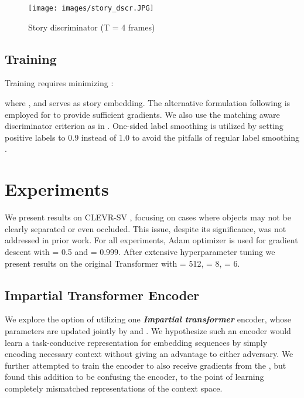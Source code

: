 \documentclass{article}
\begin{document}
\begin{figure}[t]
\centering
\texttt{[image: images/story\_dscr.JPG]}
\caption{Story discriminator  (T = 4 frames)}
\label{fig:st_dscr}
\end{figure}

\subsection{Training}
Training requires minimizing : \hfill
\vspace{-0.3cm}

where , and  serves as story embedding. The alternative formulation following \cite{goodfellow2014gans} is employed for  to provide sufficient gradients. We also
use the matching aware discriminator criterion as in \cite{ref2}. One-sided label smoothing is utilized by setting positive labels to 0.9 instead of 1.0 to avoid the pitfalls of regular label smoothing \cite{ref4}.



\section{Experiments}
\label{sec:experiments}
We present results on CLEVR-SV \cite{clevr}, focusing on cases where objects may not be clearly separated or even occluded. This issue, despite its significance, was not addressed in prior work. For all experiments, Adam optimizer \cite{adam} is used for gradient descent with  = 0.5 and  = 0.999. After extensive hyperparameter tuning we present results on the original Transformer with  = 512,  = 8,  = 6. 
\subsection{Impartial Transformer Encoder}
We explore the option of utilizing one \textbf{\textit{Impartial transformer}}  encoder, whose parameters are updated jointly
by  and . We hypothesize such an encoder would learn a task-conducive representation for embedding sequences by simply encoding necessary context without giving an advantage to either adversary. We further attempted to train the encoder to also receive gradients from the , but found this addition to be confusing the encoder, to the point of learning completely mismatched representations of the context space. 
\end{document}
